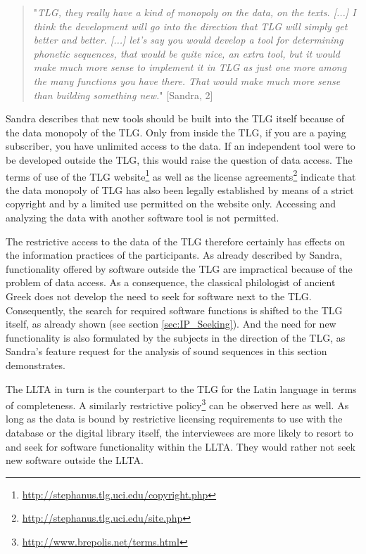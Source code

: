 \documentclass[12pt, a4paper, titlepage, oneside, abstract=true, toc=listof, toc=bibliography]{scrreprt}
\begin{document}
{\begin{quotation}
"\textit{TLG, they really have a kind of monopoly on the data, on the texts. [...] I think the development will go into the direction that TLG will simply get better and better. [...] let's say you would develop a tool for determining phonetic sequences, that would be quite nice, an extra tool, but it would make much more sense to implement it in TLG as just one more among the many functions you have there. That would make much more sense than building something new.}" [Sandra, 2]
\end{quotation}

Sandra describes that new tools should be built into the TLG itself because of the data monopoly of the TLG. Only from inside the TLG, if you are a paying subscriber, you have unlimited access to the data. If an independent tool were to be developed outside the TLG, this would raise the question of data access. 
The terms of use of the TLG website\footnote{\url{http://stephanus.tlg.uci.edu/copyright.php}} as well as the license agreements\footnote{\url{http://stephanus.tlg.uci.edu/site.php}} indicate that the data monopoly of TLG has also been legally established by means of a strict copyright and by a limited use permitted on the website only. Accessing and analyzing the data with another software tool is not permitted.

The restrictive access to the data of the TLG therefore certainly has effects on the information practices of the participants. As already described by Sandra, functionality offered by software outside the TLG are impractical because of the problem of data access. As a consequence, the classical philologist of ancient Greek does not develop the need to seek for software next to the TLG.
Consequently, the search for required software functions is shifted to the TLG itself, as already shown (see section \ref{sec:IP_Seeking}). And the need for new functionality is also formulated by the subjects in the direction of the TLG, as Sandra's feature request for the analysis of sound sequences in this section demonstrates.

The LLTA in turn is the counterpart to the TLG for the Latin language in terms of completeness. A similarly restrictive policy\footnote{\url{http://www.brepolis.net/terms.html}} can be observed here as well. As long as the data is bound by restrictive licensing requirements to use with the database or the digital library itself, the interviewees are more likely to resort to and seek for software functionality within the LLTA. They would rather not seek new software outside the LLTA.

}
\end{document}
